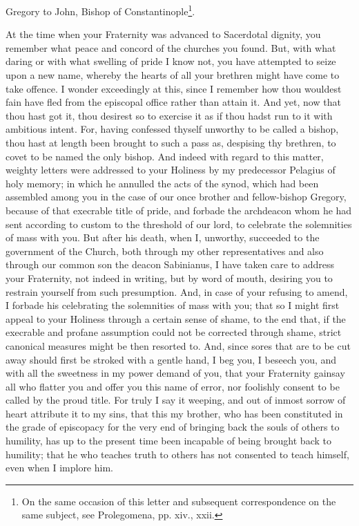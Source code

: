 
Gregory to John, Bishop of Constantinople\footnote{On the same occasion of this letter and subsequent correspondence on the same subject, see Prolegomena, pp. xiv., xxii.}.

At the time when your Fraternity was advanced to Sacerdotal dignity, you remember what peace and concord of the churches you found. But, with what daring or with what swelling of pride I know not, you have attempted to seize upon a new name, whereby the hearts of all your brethren might have come to take offence. I wonder exceedingly at this, since I remember how thou wouldest fain have fled from the episcopal office rather than attain it. And yet, now that thou hast got it, thou desirest so to exercise it as if thou hadst run to it with ambitious intent. For, having confessed thyself unworthy to be called a bishop, thou hast at length been brought to such a pass as, despising thy brethren, to covet to be named the only bishop. And indeed with regard to this matter, weighty letters were addressed to your Holiness by my predecessor Pelagius of holy memory; in which he annulled the acts of the synod, which had been assembled among you in the case of our once brother and fellow-bishop Gregory, because of that execrable title of pride, and forbade the archdeacon whom he had sent according to custom to the threshold of our lord, to celebrate the solemnities of mass with you. But after his death, when I, unworthy, succeeded to the government of the Church, both through my other representatives and also through our common son the deacon Sabinianus, I have taken care to address your Fraternity, not indeed in writing, but by word of mouth, desiring you to restrain yourself from such presumption. And, in case of your refusing to amend, I forbade his celebrating the solemnities of mass with you; that so I might first appeal to your Holiness through a certain sense of shame, to the end that, if the execrable and profane assumption could not be corrected through shame, strict canonical measures might be then resorted to. And, since sores that are to be cut away should first be stroked with a gentle hand, I beg you, I beseech you, and with all the sweetness in my power demand of you, that your Fraternity gainsay all who flatter you and offer you this name of error, nor foolishly consent to be called by the proud title. For truly I say it weeping, and out of inmost sorrow of heart attribute it to my sins, that this my brother, who has been constituted in the grade of episcopacy for the very end of bringing back the souls of others to humility, has up to the present time been incapable of being brought back to humility; that he who teaches truth to others has not consented to teach himself, even when I implore him.

